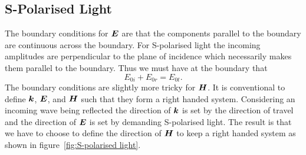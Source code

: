     \subsection{S-Polarised Light}
    The boundary conditions for \(\bm{E}\) are that the components parallel to the boundary are continuous across the boundary.
    For S-polarised light the incoming amplitudes are perpendicular to the plane of incidence which necessarily makes them parallel to the boundary.
    Thus we must have at the boundary that
    \begin{equation}\label{eqn:continuity of electric field at boundary}
        E_{0i} + E_{0r} = E_{0t}.
    \end{equation}
    The boundary conditions are slightly more tricky for \(\bm{H}\).
    It is conventional to define \(\bm{k}\), \(\bm{E}\), and \(\bm{H}\) such that they form a right handed system.
    Considering an incoming wave being reflected the direction of \(\bm{k}\) is set by the direction of travel and the direction of \(\bm{E}\) is set by demanding S-polarised light.
    The result is that we have to choose to define the direction of \(\bm{H}\) to keep a right handed system as shown in figure~\ref{fig:S-polarised light}.
